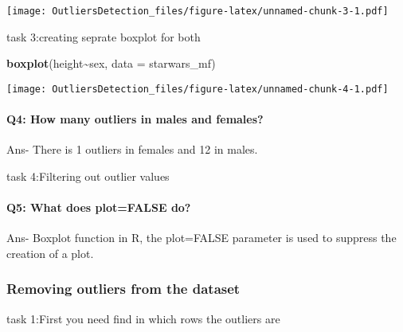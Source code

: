 \documentclass[
]{article}
\newenvironment{Shaded}{\begin{snugshade}}{\end{snugshade}}
\newcommand{\AttributeTok}[1]{\textcolor[rgb]{0.13,0.29,0.53}{#1}}
\newcommand{\ConstantTok}[1]{\textcolor[rgb]{0.56,0.35,0.01}{#1}}
\newcommand{\FunctionTok}[1]{\textcolor[rgb]{0.13,0.29,0.53}{\textbf{#1}}}
\newcommand{\NormalTok}[1]{#1}
\newcommand{\OtherTok}[1]{\textcolor[rgb]{0.56,0.35,0.01}{#1}}
\newcommand{\SpecialCharTok}[1]{\textcolor[rgb]{0.81,0.36,0.00}{\textbf{#1}}}
\begin{document}
\texttt{[image: OutliersDetection\_files/figure-latex/unnamed-chunk-3-1.pdf]}

task 3:creating seprate boxplot for both

\begin{Shaded}
\begin{Highlighting}[]
\FunctionTok{boxplot}\NormalTok{(height}\SpecialCharTok{\textasciitilde{}}\NormalTok{sex, }\AttributeTok{data =}\NormalTok{ starwars\_mf)}
\end{Highlighting}
\end{Shaded}

\texttt{[image: OutliersDetection\_files/figure-latex/unnamed-chunk-4-1.pdf]}

\hypertarget{q4-how-many-outliers-in-males-and-females}{%
\paragraph{Q4: How many outliers in males and
females?}\label{q4-how-many-outliers-in-males-and-females}}

Ans- There is 1 outliers in females and 12 in males.

task 4:Filtering out outlier values

\begin{Shaded}
\end{Shaded}

\hypertarget{q5-what-does-plotfalse-do}{%
\paragraph{Q5: What does plot=FALSE
do?}\label{q5-what-does-plotfalse-do}}

Ans- Boxplot function in R, the plot=FALSE parameter is used to suppress
the creation of a plot.

\hypertarget{removing-outliers-from-the-dataset}{%
\subsubsection{Removing outliers from the
dataset}\label{removing-outliers-from-the-dataset}}

task 1:First you need find in which rows the outliers are
\end{document}
